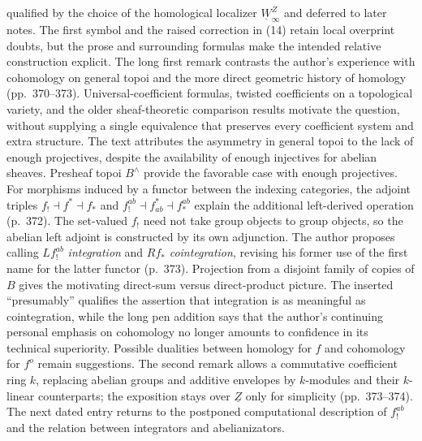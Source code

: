 \documentclass[10pt,oneside]{book}
\begin{document}
qualified by the choice of the homological localizer $\underline W_{\infty}^{Z}$ and deferred to later notes. The first symbol and the raised correction in (14) retain local overprint doubts, but the prose and surrounding formulas make the intended relative construction explicit. The long first remark contrasts the author's experience with cohomology on general topoi and the more direct geometric history of homology (pp.~370--373). Universal-coefficient formulas, twisted coefficients on a topological variety, and the older sheaf-theoretic comparison results motivate the question, without supplying a single equivalence that preserves every coefficient system and extra structure. The text attributes the asymmetry in general topoi to the lack of enough projectives, despite the availability of enough injectives for abelian sheaves. Presheaf topoi $B^{\wedge}$ provide the favorable case with enough projectives. For morphisms induced by a functor between the indexing categories, the adjoint triples $f_!\dashv f^*\dashv f_*$ and $f_!^{ab}\dashv f^*_{ab}\dashv f_*^{ab}$ explain the additional left-derived operation (p.~372). The set-valued $f_!$ need not take group objects to group objects, so the abelian left adjoint is constructed by its own adjunction. The author proposes calling $Lf_!^{ab}$ \emph{integration} and $Rf_*$ \emph{cointegration}, revising his former use of the first name for the latter functor (p.~373). Projection from a disjoint family of copies of $B$ gives the motivating direct-sum versus direct-product picture. The inserted ``presumably'' qualifies the assertion that integration is as meaningful as cointegration, while the long pen addition says that the author's continuing personal emphasis on cohomology no longer amounts to confidence in its technical superiority. Possible dualities between homology for $f$ and cohomology for $f^o$ remain suggestions. The second remark allows a commutative coefficient ring $k$, replacing abelian groups and additive envelopes by $k$-modules and their $k$-linear counterparts; the exposition stays over $\underline Z$ only for simplicity (pp.~373--374). The next dated entry returns to the postponed computational description of $f_!^{ab}$ and the relation between integrators and abelianizators.
\end{document}
